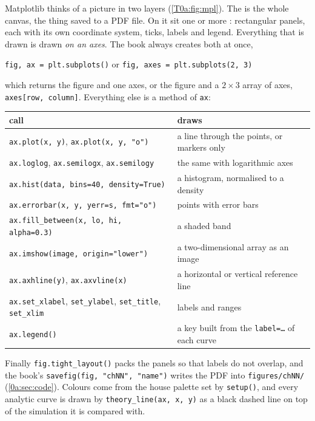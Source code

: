 Matplotlib thinks of a picture in two layers (\cref{T0a:fig:mpl}). The  is the whole canvas, the thing saved to a PDF file. On it sit one or more : rectangular panels, each with its own coordinate system, ticks, labels and legend. Everything that is drawn is drawn \emph{on an axes}. The book always creates both at once,
\begin{center}
\texttt{fig, ax = plt.subplots()} \qquad or \qquad \texttt{fig, axes = plt.subplots(2, 3)}
\end{center}
which returns the figure and one axes, or the figure and a $2\times3$ array of axes, \texttt{axes[row, column]}. Everything else is a method of \texttt{ax}:
\begin{center}
\small
\begin{tabular}{@{}ll@{}}
\toprule
call & draws \\
\midrule
\texttt{ax.plot(x, y)}, \texttt{ax.plot(x, y, "o")} & a line through the points, or markers only\\
\texttt{ax.loglog}, \texttt{ax.semilogx}, \texttt{ax.semilogy} & the same with logarithmic axes\\
\texttt{ax.hist(data, bins=40, density=True)} & a histogram, normalised to a density\\
\texttt{ax.errorbar(x, y, yerr=s, fmt="o")} & points with error bars\\
\texttt{ax.fill\_between(x, lo, hi, alpha=0.3)} & a shaded band\\
\texttt{ax.imshow(image, origin="lower")} & a two-dimensional array as an image\\
\texttt{ax.axhline(y)}, \texttt{ax.axvline(x)} & a horizontal or vertical reference line\\
\texttt{ax.set\_xlabel}, \texttt{set\_ylabel}, \texttt{set\_title}, \texttt{set\_xlim} & labels and ranges\\
\texttt{ax.legend()} & a key built from the \texttt{label=\dots} of each curve\\
\bottomrule
\end{tabular}
\end{center}
Finally \texttt{fig.tight\_layout()} packs the panels so that labels do not overlap, and the book's \texttt{savefig(fig, "chNN", "name")} writes the PDF into \texttt{figures/chNN/} (\cref{0a:sec:code}). Colours come from the house palette set by \texttt{setup()}, and every analytic curve is drawn by \texttt{theory\_line(ax, x, y)} as a black dashed line on top of the simulation it is compared with.

